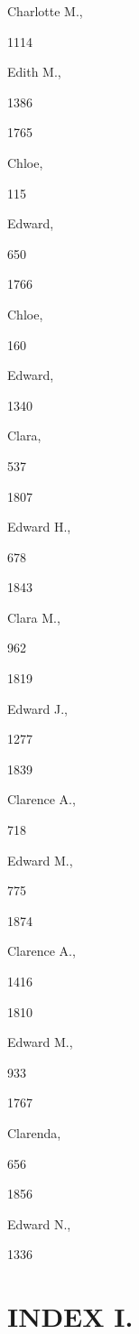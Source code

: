 Charlotte M., 


1114 




Edith M., 


1386 


1765 


Chloe, 


115 




Edward, 


650 


1766 


Chloe, 


160 




Edward, 


1340 




Clara, 


537 


1807 


Edward H., 


678 


1843 


Clara M., 


962 


1819 


Edward J., 


1277 


1839 


Clarence A., 


718 




Edward M., 


775 


1874 


Clarence A., 


1416 


1810 


Edward M., 


933 


1767 


Clarenda, 


656 


1856 


Edward N., 


1336 







\chapter{INDEX I.}



